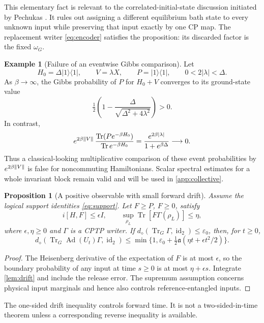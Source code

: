 \documentclass[11pt,reqno]{amsart}
\numberwithin{equation}{section}
\newtheorem{proposition}[theorem]{Proposition}
\theoremstyle{definition}
\newtheorem{example}[theorem]{Example}
\theoremstyle{remark}
\newcommand{\Tr}{\operatorname{Tr}}
\newcommand{\id}{\operatorname{id}}
\newcommand{\Ad}{\operatorname{Ad}}
\newcommand{\diam}{d_\diamond}
\newcommand{\pa}{\mathfrak a}
\DeclarePairedDelimiter{\norm}{\lVert}{\rVert}
\begin{document}
This elementary fact is relevant to the correlated-initial-state
discussion initiated by Pechukas \cite{Pechukas94}.
It rules out assigning a different equilibrium bath state to every
unknown input while preserving that input exactly by one CP map.
The replacement writer \eqref{eq:encoder} satisfies the proposition:
its discarded factor is the fixed \(\omega_G\).

\begin{example}[Failure of an eventwise Gibbs comparison]
\label{ex:gibbs-comparison}
Let
\[
 H_0=\Delta|1\rangle\langle1|,\qquad V=\lambda X,\qquad
 P=|1\rangle\langle1|,\qquad 0<2|\lambda|<\Delta .
\]
As \(\beta\to\infty\), the Gibbs probability of \(P\) for \(H_0+V\)
converges to its ground-state value
\[
       \tfrac12\left(1-\frac{\Delta}{\sqrt{\Delta^2+4\lambda^2}}\right)>0.
\]
In contrast,
\[
 e^{2\beta\norm V}\,
   \frac{\Tr(Pe^{-\beta H_0})}{\Tr e^{-\beta H_0}}
       =\frac{e^{2\beta|\lambda|}}{1+e^{\beta\Delta}}\longrightarrow0.
\]
Thus a classical-looking multiplicative comparison of these event
probabilities by \(e^{2\beta\norm V}\) is false for noncommuting
Hamiltonians. Scalar spectral estimates for a whole invariant block
remain valid and will be used in \cref{app:collective}.
\end{example}

\begin{proposition}[A positive observable with small forward drift]
\label{prop:positive-drift}
Assume the logical support identities \eqref{eq:support}.
Let \(F\ge P\), \(F\ge0\), satisfy
\[
 i[H,F]\le\epsilon I,\qquad
       \sup_{\rho_L}\Tr[F\Gamma(\rho_L)]\le\eta,
\]
where \(\epsilon,\eta\ge0\) and \(\Gamma\) is a CPTP writer.
If \(\diam(\Tr_G\Gamma,\id_2)\le\varepsilon_0\), then, for \(t\ge0\),
\[
 \diam(\Tr_G\Ad(U_t)\Gamma,\id_2)
 \le\min\{1,\varepsilon_0+
              \tfrac12\pa(\eta t+\epsilon t^2/2)\}.
\]
\end{proposition}
\begin{proof}
The Heisenberg derivative of the expectation of \(F\) is at most
\(\epsilon\), so the boundary probability of any input at time \(s\ge0\)
is at most \(\eta+\epsilon s\). Integrate \cref{lem:drift} and
include the release error. The supremum assumption concerns physical
input marginals and hence also controls reference-entangled inputs.
\end{proof}

The one-sided drift inequality controls forward time. It is not a
two-sided-in-time theorem unless a corresponding reverse inequality
is available.
\end{document}

